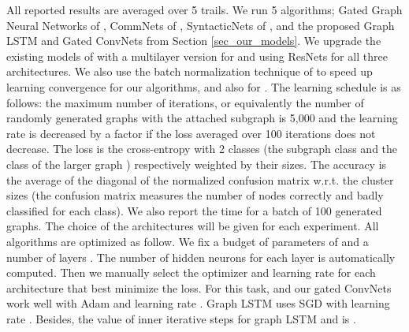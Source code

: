 \documentclass{article} \usepackage{iclr2018_conference,times}
\begin{document}
All reported results are averaged over 5 trails. We run 5 algorithms; Gated Graph Neural Networks of  \cite{art:LiTarlowBrockschmidtZemel16GNN}, CommNets of \cite{art:SukhbaatarSzlamFergus16ComAgents}, SyntacticNets of \cite{marcheggiani2017encoding}, and the proposed Graph LSTM and Gated ConvNets from Section \ref{sec_our_models}. We upgrade the existing models of \cite{art:LiTarlowBrockschmidtZemel16GNN,art:SukhbaatarSzlamFergus16ComAgents,marcheggiani2017encoding} with a multilayer version for \cite{art:LiTarlowBrockschmidtZemel16GNN} and using ResNets for all three architectures. We also use the batch normalization technique of \cite{art:IoffeSzegedy15BatchNorm} to speed up learning convergence for our algorithms, and also for \cite{art:LiTarlowBrockschmidtZemel16GNN,art:SukhbaatarSzlamFergus16ComAgents,marcheggiani2017encoding}. The learning schedule is as follows: the maximum number of iterations, or equivalently the number of randomly generated graphs with the attached subgraph is 5,000 and the learning rate is decreased by a factor  if the loss averaged over 100 iterations does not decrease. The loss is the cross-entropy with 2 classes (the subgraph  class and  the class of the larger graph ) respectively weighted by their  sizes. The accuracy is the average of the diagonal of the normalized confusion matrix w.r.t. the cluster sizes (the confusion matrix measures the number of nodes correctly and badly classified for each class). We also report the time for a batch of 100 generated graphs. The choice of the architectures will be given for each experiment. All algorithms are optimized as follow. We fix a budget of parameters of  and a number of layers . The number of hidden neurons  for each layer is automatically computed. Then we manually select the optimizer and learning rate for each architecture that best minimize the loss. For this task, \cite{art:LiTarlowBrockschmidtZemel16GNN,art:SukhbaatarSzlamFergus16ComAgents,marcheggiani2017encoding} and our gated ConvNets work well with Adam and learning rate . Graph LSTM uses SGD with learning rate . Besides, the value of inner iterative steps  for graph LSTM and \cite{art:LiTarlowBrockschmidtZemel16GNN} is . 
\end{document}
